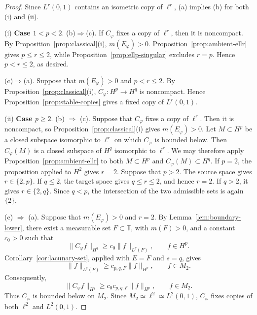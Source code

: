 \documentclass[10pt,a4paper]{amsart}
\newcommand{\T}{\mathbb{T}}
\begin{document}
\begin{proof}
Since \(L^r(0,1)\) contains an isometric copy of \(\ell^r\),
\textup{(a)} implies \textup{(b)} for both (i) and (ii).

{(i) \bf Case \(1<p<2\)}. \textup{(b)}\(\Rightarrow\)\textup{(c)}.  If \(C_\varphi\) fixes a copy of
\(\ell^r\), then it is noncompact. By
Proposition~\ref{prop:classical}\textup{(i)}, \(m(E_\varphi)>0\).
Proposition~\ref{prop:ambient-ellr} gives \(p\le r\le2\), while
Proposition~\ref{prop:ellp-singular} excludes \(r=p\). Hence
\(p<r\le2\), as desired.

\textup{(c)}\(\Rightarrow\)\textup{(a)}.  Suppose that \(m(E_\varphi)>0\) and \(p<r\le2\).
By Proposition~\ref{prop:classical}\textup{(i)},
\(C_\varphi:H^p\to H^q\) is noncompact. Hence
Proposition~\ref{prop:stable-copies} gives a
fixed copy of \(L^r(0,1)\). 





{(ii) \bf Case \(p\ge2\)}.  \textup{(b)} \(\Rightarrow\)  \textup{(c)}.  Suppose that \(C_\varphi\) fixes a copy of
\(\ell^r\). Then it is noncompact, so
Proposition~\ref{prop:classical}\textup{(i)} gives \(m(E_\varphi)>0\).
Let \(M\subset H^p\) be a closed subspace isomorphic to \(\ell^r\) on
which \(C_\varphi\) is bounded below. Then \(C_\varphi(M)\) is a closed
subspace of \(H^q\) isomorphic to \(\ell^r\). We may therefore apply
Proposition~\ref{prop:ambient-ellr} to both \(M\subset H^p\) and
\(C_\varphi(M)\subset H^q\).   If \(p=2\), the proposition applied to \(H^2\) gives \(r=2\).
Suppose that \(p>2\). The source space gives \(r\in\{2,p\}\).
If \(q\le2\), the target space gives \(q\le r\le2\), and hence
\(r=2\). If \(q>2\), it gives \(r\in\{2,q\}\). Since \(q<p\), the
intersection of the two admissible sets is again \(\{2\}\).  

 
\textup{(c)} \(\Rightarrow\) \textup{(a)}.  Suppose that \(m(E_\varphi)>0\) and \(r=2\).
By Lemma~\ref{lem:boundary-lower}, there exist a
measurable set \(F\subset\T\), with \(m(F)>0\), and a constant
\(c_0>0\) such that
\[
        \|C_\varphi f\|_{H^q}
        \ge
        c_0\|f\|_{L^q(F)},
        \qquad
        f\in H^p.
\]
Corollary~\ref{cor:lacunary-set}, applied with \(E=F\) and
\(s=q\), gives
\[
        \|f\|_{L^q(F)}
        \ge
        c_{p,q,F}\|f\|_{H^p},
        \qquad
        f\in M_2.
\]
Consequently,
\[
        \|C_\varphi f\|_{H^q}
        \ge
        c_0c_{p,q,F}\|f\|_{H^p},
        \qquad
        f\in M_2.
\]
Thus \(C_\varphi\) is bounded below on \(M_2\). Since
\(M_2\simeq\ell^2\simeq L^2(0,1)\), \(C_\varphi\) fixes copies of
both \(\ell^2\) and \(L^2(0,1)\). 
\end{proof}
\end{document}
